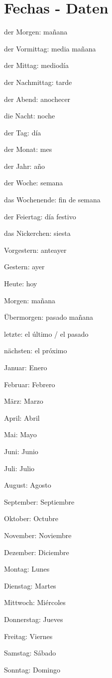 \section{Fechas - Daten}
\begin{multicols}{2}
\begin{myitemize}
\item der Morgen: mañana
\item der Vormittag: media mañana
\item der Mittag: mediodía
\item der Nachmittag: tarde
\item der Abend: anochecer
\item die Nacht: noche
\item der Tag: día
\item der Monat: mes
\item der Jahr: año
\item der Woche: semana
\item das Wochenende: fin de semana
\item der Feiertag: día festivo
\item das Nickerchen: siesta
\item Vorgestern: anteayer
\item Gestern: ayer
\item Heute: hoy
\item Morgen: mañana
\item Übermorgen: pasado mañana
\item letzte: el último / el pasado
\item nächsten: el próximo
\item Januar: Enero
\item Februar: Febrero
\item März: Marzo
\item April: Abril
\item Mai: Mayo
\item Juni: Junio
\item Juli: Julio
\item August: Agosto
\item September: Septiembre
\item Oktober: Octubre
\item November: Noviembre
\item Dezember: Diciembre
\item Montag: Lunes
\item Dienstag: Martes
\item Mittwoch: Miércoles
\item Donnerstag: Jueves
\item Freitag: Viernes
\item Samstag: Sábado
\item Sonntag: Domingo
\end{myitemize}
\end{multicols}

